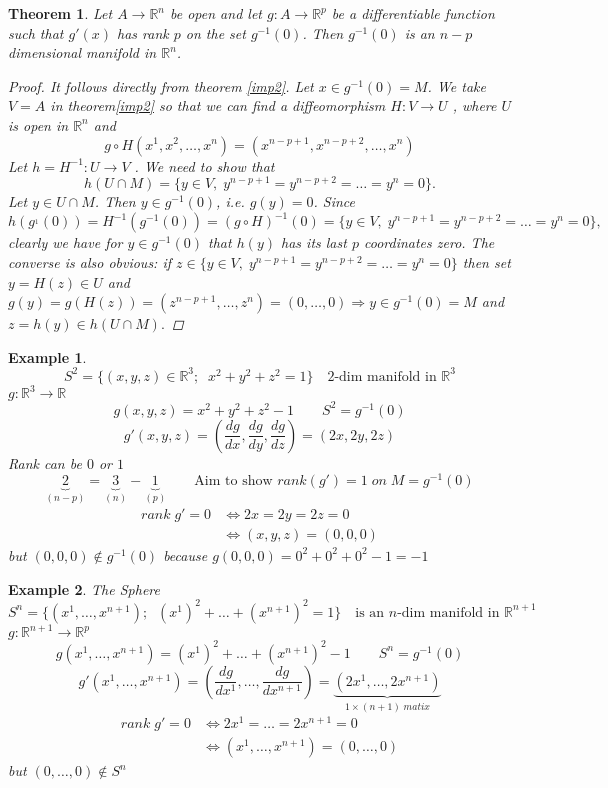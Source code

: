 \documentclass[11pt]{article}
\def\RR{\mathbb{R}}
\newtheorem{theorem}{Theorem}[section]
\newtheorem{example}{Example}[section]
\begin{document}
\begin{theorem}\label{manifold1}
 Let $A \rightarrow \RR^n$ be open and let $g : A \rightarrow \RR^p$ be a differentiable function such
that $g'(x)$ has rank $p$ on the set $g^{-1}(0)$. Then $g^{-1}(0)$ is an $n\! -\! p$ dimensional manifold in $\RR^n$.
\begin{proof}
 It follows directly from theorem \ref{imp2}. Let $x \in g^{-1}(0) = M$. We take $V = A$ in theorem\ref{imp2} so that we can find a diffeomorphism $H : V \rightarrow U$ , where $U$ is open in $\RR^n$ and 
\[g \circ H(x^1, x^2, \dots, x^n) = (x^{n-p+1}, x^{n-p+2}, \dots , x^n) \]
Let $h = H^{-1} : U \rightarrow V$ . We need to show that 
\[h(U \cap M) = \{y \in V,\; y^{n-p+1} = y^{n-p+2} = \dots = y^n = 0\}.\]
Let $y \in U \cap M$. Then $y \in g^{-1}(0)$, i.e. $g(y) = 0$. Since
\[h(g^{_1}(0)) = H^{-1}(g^{-1}(0)) = (g \circ H)^{-1}(0) = \{y \in V,\; y^{n-p+1} = y^{n-p+2} = \dots = y^n = 0\},\]
clearly we have for $ y \in g^{-1}(0)$ that $ h(y)$ has its last $p$ coordinates zero. The converse is
also obvious: if $z \in \{y \in V,\; y^{n-p+1} = y^{n-p+2} = \dots = y^n = 0\}$ then set $y = H(z) \in U$
and $g(y) = g(H(z)) = (z^{n-p+1},\dots, z^n) = (0,\dots ,0) \Rightarrow y \in g^{-1}(0) = M$ and $z = h(y) \in
h(U \cap M).$
\end{proof}
\end{theorem}

\begin{example}
\[S^2 = \{(x,y,z) \in \RR^3; \; \;  x^2 + y^2 +z^2 = 1\}\quad \text{$2$-dim manifold in $\RR^3$}\]
$g:\RR^3 \rightarrow \RR$
\[g(x,y,z) = x^2 + y^2 + z^2 - 1 \qquad S^2 = g^{-1}(0)\]
\[g'(x,y,z) = (\frac{dg}{dx}, \frac{dg}{dy}, \frac{dg}{dz}) = (2x, 2y, 2z)\]
Rank can be $0$ or $1$
\[\underbrace{2}_{(n-p)} = \underbrace{3}_{(n)}  - \underbrace{1}_{(p)} \qquad \text{Aim to show } rank(g')=1\; on\; M=g^{-1}(0) \]
\begin{align*}
rank\;g' = 0 &\Leftrightarrow 2x=2y=2z=0\\
&\Leftrightarrow (x,y,z)=(0,0,0)
\end{align*}
but $(0,0,0) \notin g^{-1}(0)$ because $g(0,0,0) = 0^2 + 0^2 +0^2 -1= -1$
\end{example}


\begin{example}The Sphere 
\[S^n = \{(x^1,\dots,x^{n+1}); \; \; ( x^1)^2 + \dots +(x^{n+1})^2  = 1\}\quad \text{is an $n$-dim manifold in $\RR^{n+1}$}\]
$g:\RR^{n+1} \rightarrow \RR^p$
\[g(x^1,\dots,x^{n+1}) =( x^1)^2 + \dots +(x^{n+1})^2  - 1 \qquad S^n = g^{-1}(0)\]
\[g'(x^1,\dots,x^{n+1})  = (\frac{dg}{dx^1},\dots , \frac{dg}{dx^{n+1}}) = \underbrace{(2x^1, \dots, 2x^{n+1})}_{1 \times (n+1)\; matix}\]
\begin{align*}
rank\;g' = 0 &\Leftrightarrow 2x^1=\dots =2x^{n+1}=0\\
&\Leftrightarrow (x^1,\dots ,x^{n+1})=(0,\dots ,0)
\end{align*}
but $(0,\dots ,0) \notin S^n$
\end{example}
\end{document}
